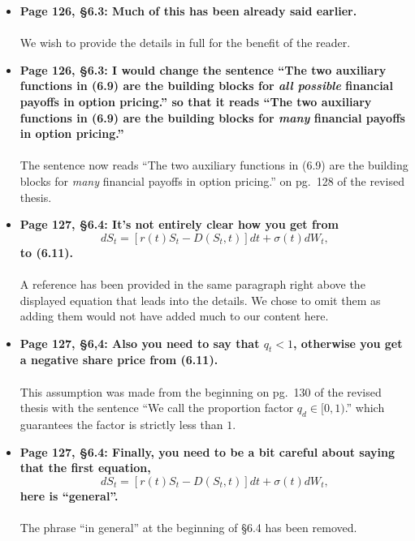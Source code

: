 \documentclass{article}
\begin{document}
\begin{enumerate}
\begin{itemize}
			\item{\textbf{Page 126, \S6.3: Much of this has been already said earlier. 
			\\\\}}
			We wish to provide the details in full for the benefit of the reader.
			
			\item{\textbf{Page 126, \S6.3:  I would change the sentence ``The two auxiliary functions in (6.9) are the building blocks for \emph{all possible} financial payoffs in option pricing.'' so that it reads ``The two auxiliary functions in (6.9) are the building blocks for \emph{many} financial payoffs in option pricing.''
			\\\\}}
			The sentence now reads  ``The two auxiliary functions in (6.9) are the building blocks for \emph{many} financial payoffs in option pricing.'' on pg.~128 of the revised thesis.
			
			\item{\textbf{Page 127, \S6.4:  It's not entirely clear how you get from
				$$
					dS_t = [r(t)S_t - D(S_t,t)]dt + \sigma(t) dW_t,
				$$
				to (6.11).\\\\}}
			A reference has been provided in the same paragraph right above the displayed equation that leads into the details. We chose to omit them as adding them would not have added much to our content here.
			
			\item{\textbf{Page 127, \S6,4:  Also you need to say that $q_t < 1$, otherwise you get a negative share price from (6.11). 
			\\\\}}
			This assumption was made from the beginning on pg.~130 of the revised thesis with the sentence ``We call the proportion factor $q_d \in [0,1)$.'' which guarantees the factor is strictly less than $1$.
			
			\item{\textbf{Page 127, \S6.4:  Finally, you need to be a bit careful about saying that the first equation,
							$$
					dS_t = [r(t)S_t - D(S_t,t)]dt + \sigma(t) dW_t,
				$$
				here is ``general''.\\\\}}
				The phrase ``in general'' at the beginning of \S6.4 has been removed.
				

\end{itemize}
\end{enumerate}
\end{document}
